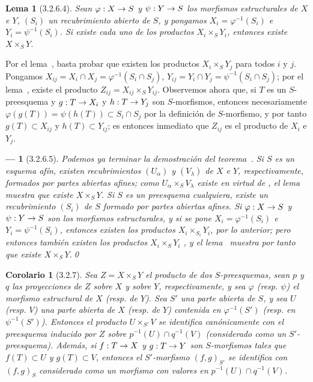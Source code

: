 \documentclass[oneside]{amsart}
\theoremstyle{ega-env-style}
\newtheorem*{env}{---}
\theoremstyle{ega-thm-env-style}
\newtheorem*{lemma}{Lema}
\newtheorem*{corollary}{Corolario}
\theoremstyle{ega-defn-env-style}
\renewcommand{\to}{\mathchoice{\longrightarrow}{\rightarrow}{\rightarrow}{\rightarrow}}
\newcommand{\oldpage}[2][]{{\marginnote{\normalfont{\textbf{#1}~|~#2}}}\ignorespaces}
\let\EGAOriginalLabel\label
\renewcommand{\label}[1]{\phantomsection\EGAOriginalLabel{#1}}
\begin{document}
\begin{lemma}[3.2.6.4]
\label{I.3.2.6.4}
Sean $\varphi:X\to S$ y $\psi:Y\to S$ los morfismos estructurales de $X$ e $Y$, $(S_i)$ un
recubrimiento abierto de $S$, y pongamos $X_i=\varphi^{-1}(S_i)$ e $Y_i=\psi^{-1}(S_i)$. Si existe cada uno
de los productos $X_i\times_S Y_i$, entonces existe $X\times_S Y$.
\end{lemma}

Por el lema~, basta probar que existen los productos
$X_i\times_S Y_j$ para todos $i$ y $j$. Pongamos
$X_{ij}=X_i\cap X_j=\varphi^{-1}(S_i\cap S_j)$, $Y_{ij}=Y_i\cap Y_j=\psi^{-1}(S_i\cap S_j)$;
por el lema~, existe el producto $Z_{ij}=X_{ij}\times_S Y_{ij}$. Observemos ahora
que, si $T$ es un $S$-preesquema y $g:T\to X_i$ y $h:T\to Y_j$ son $S$-morfismos,
entonces necesariamente $\varphi(g(T))=\psi(h(T))\subset S_i\cap S_j$ por la
definición de $S$-morfismo, y por tanto $g(T)\subset X_{ij}$ y $h(T)\subset Y_{ij}$; es
entonces inmediato que $Z_{ij}$ es el producto de $X_i$ e $Y_j$.

\begin{env}[3.2.6.5]
\label{I.3.2.6.5}
Podemos ya terminar la demostración del teorema~. Si $S$ es un
\emph{esquema afín}, existen recubrimientos $(U_\alpha)$ y $(V_\lambda)$ de $X$ e $Y$, respectivamente,
formados por partes abiertas afines; como $U_\alpha\times_S V_\lambda$ existe en virtud de
, el lema~ muestra que existe $X\times_S Y$. Si $S$
es un preesquema cualquiera, existe un recubrimiento $(S_i)$ de $S$ formado por partes abiertas afines. Si
$\varphi:X\to S$ y $\psi:Y\to S$ son los morfismos estructurales, y si se pone
$X_i=\varphi^{-1}(S_i)$ e $Y_i=\psi^{-1}(S_i)$, entonces existen los productos $X_i\times_{S_i}Y_i$, por lo
\oldpage[I]{108}
anterior; pero entonces también existen los productos $X_i\times_S Y_i$ , y
el lema~ muestra por tanto que existe $X\times_S Y$.\qed
\end{env}

\begin{corollary}[3.2.7]
\label{I.3.2.7}
Sea $Z=X\times_S Y$ el producto de dos $S$-preesquemas, sean $p$ y $q$ las proyecciones de $Z$
sobre $X$ y sobre $Y$, respectivamente, y sea $\varphi$ \textup{(resp. $\psi$)} el morfismo estructural de
$X$ (resp. de $Y$). Sea $S'$ una
parte abierta de $S$, y sea $U$ \textup{(resp. $V$)} una parte abierta de $X$ (resp. de $Y$) contenida en
$\varphi^{-1}(S')$ \textup{(resp.} en $\psi^{-1}(S')$\textup{)}. Entonces el producto $U\times_{S'}V$ se identifica
canónicamente con el preesquema inducido por $Z$ sobre $p^{-1}(U)\cap q^{-1}(V)$ (considerado como un
$S'$-preesquema). Además, si $f:T\to X$ y $g:T\to Y$ son $S$-morfismos tales que
$f(T)\subset U$ y $g(T)\subset V$, entonces el $S'$-morfismo $(f,g)_{S'}$ se identifica con
$(f,g)_S$ considerado como un morfismo con valores en $p^{-1}(U)\cap q^{-1}(V)$.
\end{corollary}
\end{document}
